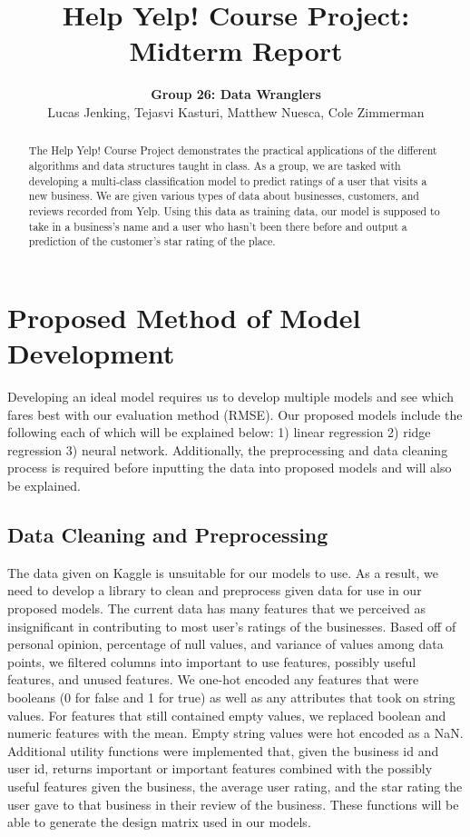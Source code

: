 \documentclass[notitlepage,11pt]{article}
\title{Help Yelp! Course Project: Midterm Report}
\author{\textbf{Group 26: Data Wranglers} \\ Lucas Jenking, Tejasvi Kasturi, Matthew Nuesca, Cole Zimmerman}
\begin{document}
\maketitle

\begin{abstract}
The Help Yelp! Course Project demonstrates the practical applications of the different algorithms and data structures taught in class. As a group, we are tasked with developing a multi-class classification model to predict ratings of a user that visits a new business. We are given various types of data about businesses, customers, and reviews recorded from Yelp. Using this data as training data, our model is supposed to take in a business's name and a user who hasn't been there before and output a prediction of the customer's star rating of the place. 
\end{abstract}

\section{Proposed Method of  Model Development}
Developing an ideal model requires us to develop multiple models and see which fares best with our evaluation method (RMSE). Our proposed models include the following each of which will be explained below: 1) linear regression 2) ridge regression 3) neural network. Additionally, the preprocessing and data cleaning process is required before inputting the data into proposed models and will also be explained. 

\subsection{Data Cleaning and Preprocessing}
The data given on Kaggle is unsuitable for our models to use. As a result, we need to develop a library to clean and preprocess given data for use in our proposed models. The current data has many features that we perceived as insignificant in contributing to most user's ratings of the businesses. Based off of personal opinion, percentage of null values, and variance of values among data points, we filtered columns into important to use features, possibly useful features, and unused features. We one-hot encoded any features that were booleans (0 for false and 1 for true) as well as any attributes that took on string values. For features that still contained empty values, we replaced boolean and numeric features with the mean. Empty string values were hot encoded as a NaN. \\
Additional utility functions were implemented that, given the business id and user id,  returns important or important features combined with the possibly useful features given the business, the average user rating, and the star rating the user gave to that business in their review of the business. These functions will be able to generate the design matrix used in our models. 
 
\end{document}

